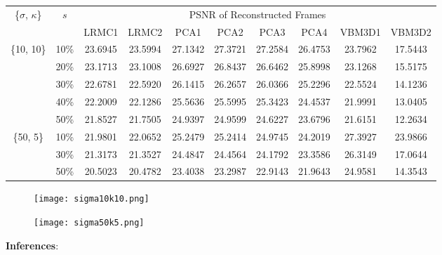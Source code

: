 \documentclass[fleqn, 11pt]{article}
\begin{document}
\begin{table}[H]
    \centering
    \begin{tabular}{||c|c||c|c||c|c|c|c||c|c||}
         \hline
         \multirow{2}{*}{\{$\sigma$, $\kappa$\}} & \multirow{2}{*}{$s$} & \multicolumn{8}{c||}{PSNR of Reconstructed Frames} \\
         \cline{3-10}
         & & LRMC1 & LRMC2 & PCA1 & PCA2 & PCA3 & PCA4 & VBM3D1 & VBM3D2 \\
         \hline
         \multirow{5}{*}{\{10, 10\}} & 10\% & 23.6945 & 23.5994 & 27.1342 & 27.3721 & 27.2584 & 26.4753 & 23.7962 & 17.5443 \\
         \cline{2-10}
          & 20\% & 23.1713 & 23.1008 & 26.6927 & 26.8437 & 26.6462 & 25.8998 & 23.1268 & 15.5175 \\
         \cline{2-10}
          & 30\% & 22.6781 & 22.5920 & 26.1415 & 26.2657 & 26.0366 & 25.2296 & 22.5524 & 14.1236 \\
         \cline{2-10}
          & 40\% & 22.2009 & 22.1286 & 25.5636 & 25.5995 & 25.3423 & 24.4537 & 21.9991 & 13.0405 \\
         \cline{2-10}
          & 50\% & 21.8527 & 21.7505 & 24.9397 & 24.9599 & 24.6227 & 23.6796 & 21.6151 & 12.2634 \\
         \hline
         \multirow{3}{*}{\{50, 5\}} & 10\% & 21.9801 & 22.0652 & 25.2479 & 25.2414 & 24.9745 & 24.2019 & 27.3927 & 23.9866 \\
         \cline{2-10}
          & 30\% & 21.3173 & 21.3527 & 24.4847 & 24.4564 & 24.1792 & 23.3586 & 26.3149 & 17.0644 \\
         \cline{2-10}
          & 50\% & 20.5023 & 20.4782 & 23.4038 & 23.2987 & 22.9143 & 21.9643 & 24.9581 & 14.3543 \\
         \hline
    \end{tabular}
\end{table}

\vspace{-2em}
\begin{figure}[H]
    \centering
    \texttt{[image: sigma10k10.png]}
\end{figure}

\begin{figure}[H]
    \centering
    \texttt{[image: sigma50k5.png]}
\end{figure}

\textbf{Inferences}:
\end{document}
